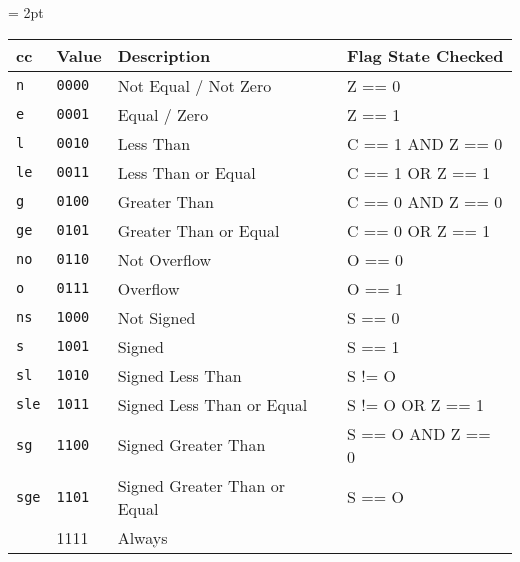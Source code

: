 {
  \tabulinesep = 2pt
  \begin{tabu} to \linewidth { X[-2c]  X[-1c]  X[2.8l]  X[2l] }
cc & Value & Description & Flag State Checked \\
\hline
\texttt{n} & \texttt{0000} & Not Equal / Not Zero & Z == 0 \\
\texttt{e} & \texttt{0001} & Equal / Zero & Z == 1 \\
\texttt{l} & \texttt{0010} & Less Than & C == 1 AND Z == 0 \\
\texttt{le} & \texttt{0011} & Less Than or Equal & C == 1 OR Z == 1 \\
\texttt{g} & \texttt{0100} & Greater Than & C == 0 AND Z == 0 \\
\texttt{ge} & \texttt{0101} & Greater Than or Equal & C == 0 OR Z == 1 \\
\texttt{no} & \texttt{0110} & Not Overflow & O == 0 \\
\texttt{o} & \texttt{0111} & Overflow & O == 1 \\
\texttt{ns} & \texttt{1000} & Not Signed & S == 0 \\
\texttt{s} & \texttt{1001} & Signed & S == 1 \\
\texttt{sl} & \texttt{1010} & Signed Less Than & S != O \\
\texttt{sle} & \texttt{1011} & Signed Less Than or Equal & S != O OR Z == 1 \\
\texttt{sg} & \texttt{1100} & Signed Greater Than & S == O AND Z == 0 \\
\texttt{sge} & \texttt{1101} & Signed Greater Than or Equal & S == O \\
 & 1111 & Always &  \\
\end{tabu}
}